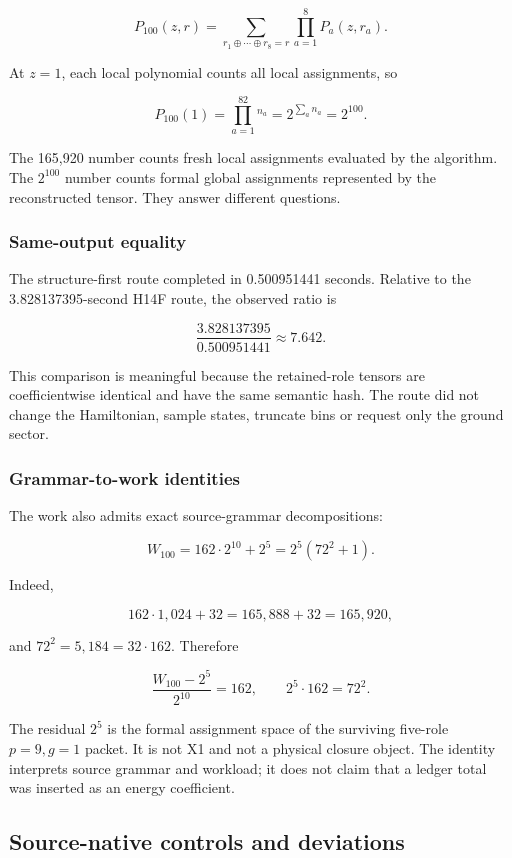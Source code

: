 \[
P_{100}(z,r)
=\sum_{r_1\oplus\cdots\oplus r_8=r}
 \prod_{a=1}^8P_a(z,r_a).
\]

At \(z=1\), each local polynomial counts all local assignments, so

\[
P_{100}(1)
=\prod_{a=1}^82^{n_a}
=2^{\sum_an_a}
=2^{100}.
\]

The 165,920 number counts fresh local assignments evaluated by the
algorithm. The \(2^{100}\) number counts formal global assignments
represented by the reconstructed tensor. They answer different
questions.

\subsubsection{Same-output equality}\label{viii-ch01-same-output-equality}

The structure-first route completed in 0.500951441 seconds. Relative to
the 3.828137395-second H14F route, the observed ratio is

\[
\frac{3.828137395}{0.500951441}\approx7.642.
\]

This comparison is meaningful because the retained-role tensors are
coefficientwise identical and have the same semantic hash. The route did
not change the Hamiltonian, sample states, truncate bins or request only
the ground sector.

\subsubsection{Grammar-to-work
identities}\label{viii-ch01-grammar-to-work-identities}

The work also admits exact source-grammar decompositions:

\[
W_{100}=162\cdot2^{10}+2^5
=2^5(72^2+1).
\]

Indeed,

\[
162\cdot1{,}024+32=165{,}888+32=165{,}920,
\]

and \(72^2=5{,}184=32\cdot162\). Therefore

\[
\frac{W_{100}-2^5}{2^{10}}=162,
\qquad
2^5\cdot162=72^2.
\]

The residual \(2^5\) is the formal assignment space of the surviving
five-role \(p=9,g=1\) packet. It is not X1 and not a physical closure
object. The identity interprets source grammar and workload; it does not
claim that a ledger total was inserted as an energy coefficient.

\subsection{Source-native controls and
deviations}\label{viii-ch01-source-native-controls-and-deviations-1}

